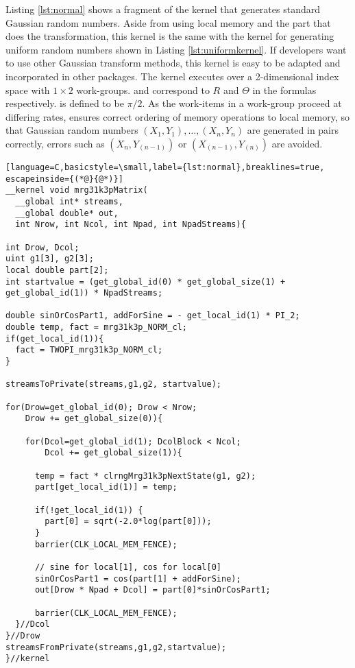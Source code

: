 \documentclass[article,nojss]{jss}\usepackage[]{graphicx}\usepackage[]{color}
\begin{document}
Listing \ref{lst:normal} shows a fragment of the kernel that generates standard Gaussian random numbers. Aside from using local memory and the part that does the transformation, this kernel is the same with the kernel for generating uniform random numbers shown in Listing \ref{lst:uniformkernel}. If developers want to use other Gaussian transform methods, this kernel is easy to be adapted and incorporated in other  packages. The kernel executes over a 2-dimensional index space with $1 \times 2$ work-groups.  and  correspond to $R$ and $\Theta$ in the formulas respectively.  is defined to be $\pi/2$. As the work-items in a work-group proceed at differing rates,  ensures correct ordering of memory operations to local memory, so that Gaussian random numbers $(X_1,Y_1), \dots, (X_n,Y_n)$ are generated in pairs correctly, errors such as $(X_n, Y_{(n-1)})$ or $(X_{(n-1)}, Y_{(n)})$ are avoided.
%

\begin{lstlisting}[language=C,basicstyle=\small,label={lst:normal},breaklines=true, escapeinside={(*@}{@*)}]
__kernel void mrg31k3pMatrix(
  __global int* streams,
  __global double* out,
  int Nrow, int Ncol, int Npad, int NpadStreams){

int Drow, Dcol;
uint g1[3], g2[3];
local double part[2];
int startvalue = (get_global_id(0) * get_global_size(1) + 
get_global_id(1)) * NpadStreams;

double sinOrCosPart1, addForSine = - get_local_id(1) * PI_2;
double temp, fact = mrg31k3p_NORM_cl;
if(get_local_id(1)){
  fact = TWOPI_mrg31k3p_NORM_cl;
}

streamsToPrivate(streams,g1,g2, startvalue);

for(Drow=get_global_id(0); Drow < Nrow;
    Drow += get_global_size(0)){

    for(Dcol=get_global_id(1); DcolBlock < Ncol; 
        Dcol += get_global_size(1)){
        
      temp = fact * clrngMrg31k3pNextState(g1, g2);
      part[get_local_id(1)] = temp;
      
      if(!get_local_id(1)) {
        part[0] = sqrt(-2.0*log(part[0]));
      }
      barrier(CLK_LOCAL_MEM_FENCE);
      
      // sine for local[1], cos for local[0]
      sinOrCosPart1 = cos(part[1] + addForSine);
      out[Drow * Npad + Dcol] = part[0]*sinOrCosPart1;

      barrier(CLK_LOCAL_MEM_FENCE);
  }//Dcol
}//Drow
streamsFromPrivate(streams,g1,g2,startvalue);
}//kernel
\end{lstlisting}
\end{document}
